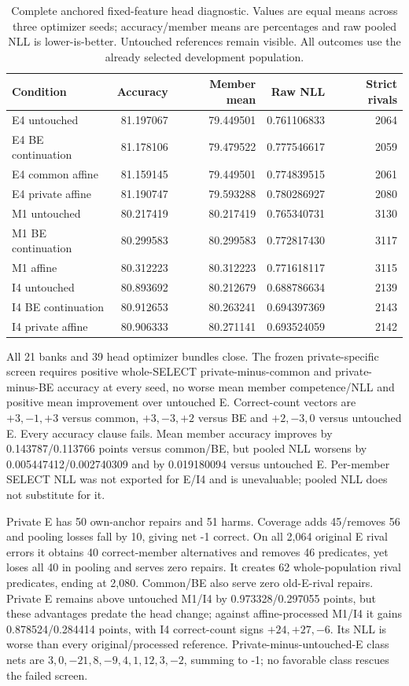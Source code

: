 \begin{table}[t]
\centering\small\setlength{\tabcolsep}{4pt}
\caption{Complete anchored fixed-feature head diagnostic. Values are equal means across three optimizer seeds; accuracy/member means are percentages and raw pooled NLL is lower-is-better. Untouched references remain visible. All outcomes use the already selected development population.}
\label{tab:E-head-absolute}
\begin{tabular}{lrrrr}
\toprule
Condition & Accuracy & Member mean & Raw NLL & Strict rivals\\
\midrule
E4 untouched & 81.197067 & 79.449501 & 0.761106833 & 2064\\
E4 BE continuation & 81.178106 & 79.479522 & 0.777546617 & 2059\\
E4 common affine & 81.159145 & 79.449501 & 0.774839515 & 2061\\
E4 private affine & 81.190747 & 79.593288 & 0.780286927 & 2080\\
M1 untouched & 80.217419 & 80.217419 & 0.765340731 & 3130\\
M1 BE continuation & 80.299583 & 80.299583 & 0.772817430 & 3117\\
M1 affine & 80.312223 & 80.312223 & 0.771618117 & 3115\\
I4 untouched & 80.893692 & 80.212679 & 0.688786634 & 2139\\
I4 BE continuation & 80.912653 & 80.263241 & 0.694397369 & 2143\\
I4 private affine & 80.906333 & 80.271141 & 0.693524059 & 2142\\
\bottomrule\end{tabular}\end{table}

All 21 banks and 39 head optimizer bundles close. The frozen private-specific screen requires positive whole-SELECT private-minus-common and private-minus-BE accuracy at every seed, no worse mean member competence/NLL and positive mean improvement over untouched E. Correct-count vectors are $+3,-1,+3$ versus common, $+3,-3,+2$ versus BE and $+2,-3,0$ versus untouched E. Every accuracy clause fails. Mean member accuracy improves by 0.143787/0.113766 points versus common/BE, but pooled NLL worsens by 0.005447412/0.002740309 and by 0.019180094 versus untouched E. Per-member SELECT NLL was not exported for E/I4 and is unevaluable; pooled NLL does not substitute for it.

Private E has 50 own-anchor repairs and 51 harms. Coverage adds 45/removes 56 and pooling losses fall by 10, giving net -1 correct. On all 2,064 original E rival errors it obtains 40 correct-member alternatives and removes 46 predicates, yet loses all 40 in pooling and serves zero repairs. It creates 62 whole-population rival predicates, ending at 2,080. Common/BE also serve zero old-E-rival repairs. Private E remains above untouched M1/I4 by 0.973328/0.297055 points, but these advantages predate the head change; against affine-processed M1/I4 it gains 0.878524/0.284414 points, with I4 correct-count signs $+24,+27,-6$. Its NLL is worse than every original/processed reference. Private-minus-untouched-E class nets are $3,0,-21,8,-9,4,1,12,3,-2$, summing to -1; no favorable class rescues the failed screen.


